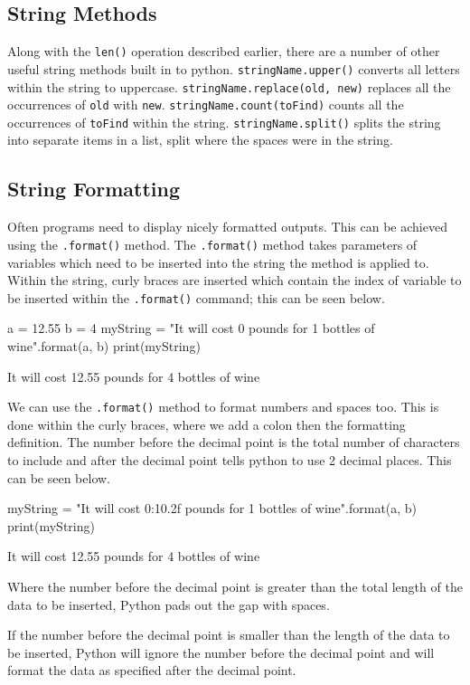 \subsection*{String Methods}
Along with the \verb|len()| operation described earlier, there are a number of other useful string methods built in to python. \verb|stringName.upper()| converts all letters within the string to uppercase. \verb|stringName.replace(old, new)| replaces all the occurrences of \verb|old| with \verb|new|. \verb|stringName.count(toFind)| counts all the occurrences of \verb|toFind| within the string. \verb|stringName.split()| splits the string into separate items in a list, split where the spaces were in the string.

\subsection*{String Formatting}
Often programs need to display nicely formatted outputs. This can be achieved using the \verb|.format()| method. The \verb|.format()| method takes parameters of variables which need to be inserted into the string the method is applied to. Within the string, curly braces are inserted which contain the index of variable to be inserted within the \verb|.format()| command; this can be seen below.
\begin{python}
a = 12.55
b = 4
myString = "It will cost {0} pounds for {1} bottles of wine".format(a, b)
print(myString)
\end{python}
\begin{pseudo*}
It will cost 12.55 pounds for 4 bottles of wine
\end{pseudo*}
We can use the \verb|.format()| method to format numbers and spaces too. This is done within the curly braces, where we add a colon then the formatting definition. The number before the decimal point is the total number of characters to include and after the decimal point tells python to use 2 decimal places. This can be seen below.
\begin{python}
myString = "It will cost {0:10.2f} pounds for {1} bottles of wine".format(a, b)
print(myString)
\end{python}
\begin{pseudo*}
It will cost      12.55 pounds for 4 bottles of wine
\end{pseudo*}
Where the number before the decimal point is greater than the total length of the data to be inserted, Python pads out the gap with spaces.

If the number before the decimal point is smaller than the length of the data to be inserted, Python will ignore the number before the decimal point and will format the data as specified after the decimal point.

